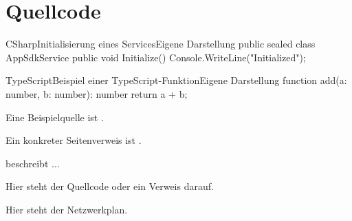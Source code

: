 \documentclass[11pt]{template}
\begin{document}
\section{Quellcode}

\begin{documentcode}{CSharp}{Initialisierung eines Services}{Eigene Darstellung}
public sealed class AppSdkService
{
    public void Initialize()
    {
        Console.WriteLine("Initialized");
    }
}
\end{documentcode}

\begin{documentcode}{TypeScript}{Beispiel einer TypeScript-Funktion}{Eigene Darstellung}
function add(a: number, b: number): number {
    return a + b;
}
\end{documentcode}


Eine Beispielquelle ist \parencite{knuth1984}.

Ein konkreter Seitenverweis ist \parencite[12]{knuth1984}.

\textcite{knuth1984} beschreibt ...

\printreferences

\startappendices

Hier steht der Quellcode oder ein Verweis darauf.

Hier steht der Netzwerkplan.
\end{document}
